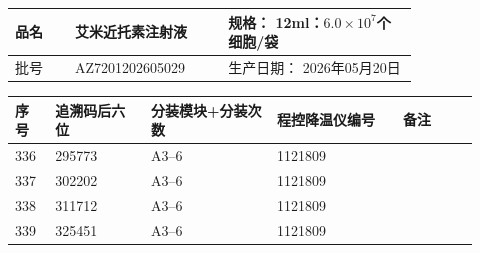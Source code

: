 \documentclass[UTF8,10pt,a4paper,fontset=fandol]{ctexart}
\newcommand{\fieldvalue}[1]{#1}
\begin{document}
\begin{center}
\small
\begin{tabular}{|p{0.12\linewidth}|p{0.30\linewidth}|p{0.38\linewidth}|}
\hline
品名 &
\fieldvalue{艾米近托素注射液} &
规格：
\fieldvalue{12ml：$6.0\times10^{7}$个细胞/袋}
\\ \hline
批号 &
\fieldvalue{AZ7201202605029} &
生产日期：
\fieldvalue{2026年05月20日}
\\ \hline
\end{tabular}

\vspace{2pt}

\scriptsize
\begin{tabular}{|p{0.08\linewidth}|p{0.19\linewidth}|p{0.25\linewidth}|p{0.25\linewidth}|p{0.15\linewidth}|}
\hline
序号 & 追溯码后六位 & 分装模块+分装次数 & 程控降温仪编号 & 备注 \\
\hline
\fieldvalue{336} &
\fieldvalue{295773} &
\fieldvalue{A3--6} &
\fieldvalue{1121809} & \\ \hline
\fieldvalue{337} &
\fieldvalue{302202} &
\fieldvalue{A3--6} &
\fieldvalue{1121809} & \\ \hline
\fieldvalue{338} &
\fieldvalue{311712} &
\fieldvalue{A3--6} &
\fieldvalue{1121809} & \\ \hline
\fieldvalue{339} &
\fieldvalue{325451} &
\fieldvalue{A3--6} &
\fieldvalue{1121809} & \\ \hline

\end{tabular}
\end{center}
\end{document}
